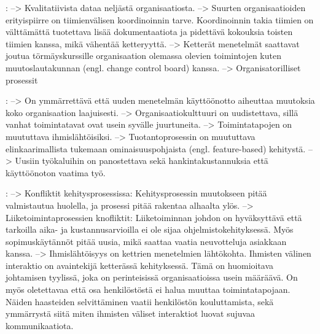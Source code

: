 :
--> Kvalitatiivista dataa neljästä organisaatiosta. \newline
--> Suurten organisaatioiden erityispiirre on tiimienvälisen koordinoinnin
tarve. Koordinoinnin takia tiimien on välttämättä tuotettava lisää
dokumentaatiota ja pidettävä kokouksia toisten tiimien kanssa, mikä vähentää
ketteryyttä. \newline
--> Ketterät menetelmät saattavat joutua törmäyskurssille organisaation olemassa
olevien toimintojen kuten muutoslautakunnan (engl. change control board) kanssa. \newline
--> Organisatorilliset prosessit

:
--> On ymmärrettävä että uuden menetelmän käyttöönotto aiheuttaa muutoksia koko
organisaation laajuisesti. \newline
--> Organisaatiokulttuuri on uudistettava, sillä vanhat toimintatavat ovat usein
syvälle juurtuneita. \newline
--> Toimintatapojen on muututtava ihmislähtöisiksi. \newline
--> Tuotantoprosessin on muututtava elinkaarimallista tukemaan
ominaisuuspohjaista (engl. feature-based) kehitystä. \newline
--> Uusiin työkaluihin on panostettava sekä hankintakustannuksia että
käyttöönoton vaatima työ.

:
--> Konfliktit kehitysprosessissa: Kehitysprosessin muutokseen pitää
valmistautua huolella, ja prosessi pitää rakentaa alhaalta ylös. \newline
--> Liiketoimintaprosessien knofliktit: Liiketoiminnan johdon on hyväksyttävä
että tarkoilla aika- ja kustannusarvioilla ei ole sijaa ohjelmistokehityksessä.
Myös sopimuskäytännöt pitää uusia, mikä saattaa vaatia neuvotteluja asiakkaan
kanssa. \newline
--> Ihmislähtöisyys on kettrien menetelmien lähtökohta. Ihmisten välinen
interaktio on avaintekijä ketterässä kehityksessä. Tämä on huomioitava
johtamisen tyylissä, joka on perinteisissä organisaatioissa usein määräävä. On
myös oletettavaa että osa henkilöstöstä ei halua muuttaa toimintatapojaan.
Näiden haasteiden selvittäminen vaatii henkilöstön kouluttamista, sekä
ymmärrystä siitä miten ihmisten väliset interaktiot luovat sujuvaa
kommunikaatiota.

